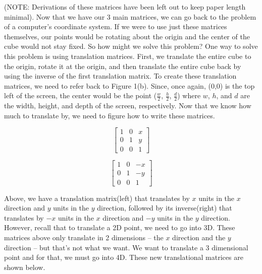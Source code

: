 \documentclass[14pt]{article}
\begin{document}
(NOTE: Derivations of these 	matrices have been left out to keep paper length minimal). Now that we have our 3 main matrices, we can go back to the problem of a computer's coordinate system. If we were to use just these matrices themselves, our points would be rotating about the origin and the center of the cube would not stay fixed. So how might we solve this problem? One way to solve this problem is using translation matrices. First, we translate the entire cube to the origin, rotate it at the origin, and then translate the entire cube back by using the inverse of the first translation matrix. To create these translation matrices, we need to refer back to Figure 1(b). Since, once again, (0,0) is the top left of the screen, the center would be the point ($\frac{w}{2}$, $\frac{h}{2}$, $\frac{d}{2}$) where $w$, $h$, and $d$ are the width, height, and depth of the screen, respectively. Now that we know how much to translate by, we need to figure how to write these matrices.

\begin{figure}[H]
	\begin{center}
		\begin{minipage}[b]{0.45\textwidth}
			\centering
			
			$$
			\begin{bmatrix}
			1 & 0 & x \\
			0 & 1 & y \\ 
			0 & 0 & 1
			\end{bmatrix}
			$$
		\end{minipage}
		\hfill
		\begin{minipage}[b]{0.45\textwidth}
			\centering
			$$
			\begin{bmatrix}
			1 & 0 & -x \\
			0 & 1 & -y \\ 
			0 & 0 & 1
			\end{bmatrix}			
			$$
		\end{minipage}
	\end{center}
\end{figure}

Above, we have a translation matrix(left) that translates by $x$ units in the $x$ direction and $y$ units in the $y$ direction, followed by its inverse(right) that translates by $-x$ units in the $x$ direction and $-y$ units in the $y$ direction. However, recall that to translate a 2D point, we need to go into 3D. These matrices above only translate in 2 dimensions -- the $x$ direction and the $y$ direction -- but that's not what we want. We want to translate a 3 dimensional point and for that, we must go into 4D. These new translational matrices are shown below.
\end{document}
